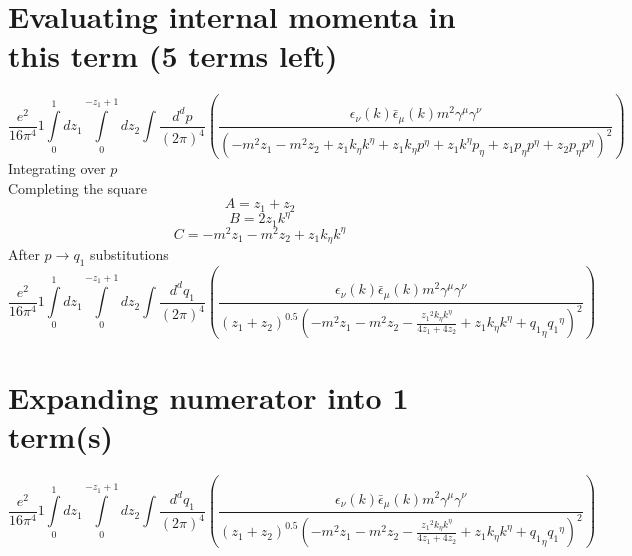 \section*{Evaluating internal momenta in this term (5 terms left)}
\begin{dmath}\frac{e^{2}}{16 \pi^{4}}1\int\limits_{ 0 }^{ 1 } d{ z_{ 1 } }\int\limits_{ 0 }^{ - { z_{ 1 } } + 1 } d{ z_{ 2 } }\int\frac{d^d p }{ (2\pi)^4 }\left(\frac{\epsilon_{ \nu }({ k }) \bar{\epsilon}_{ \mu }({ k }) m^{2} { \gamma^{ \mu } } { \gamma^{ \nu } }}{\left(- m^{2} { z_{ 1 } } - m^{2} { z_{ 2 } } + { z_{ 1 } } { { k }_{ \eta } } { { k }^{ \eta } } + { z_{ 1 } } { { k }_{ \eta } } { { p }^{ \eta } } + { z_{ 1 } } { { k }^{ \eta } } { { p }_{ \eta } } + { z_{ 1 } } { { p }_{ \eta } } { { p }^{ \eta } } + { z_{ 2 } } { { p }_{ \eta } } { { p }^{ \eta } }\right)^{2}}\right)\end{dmath}
Integrating over $p$\\
Completing the square\
\begin{dmath}A = { z_{ 1 } } + { z_{ 2 } }\end{dmath}
\begin{dmath}B = 2 { z_{ 1 } } { { k }^{ \eta } }\end{dmath}
\begin{dmath}C = - m^{2} { z_{ 1 } } - m^{2} { z_{ 2 } } + { z_{ 1 } } { { k }_{ \eta } } { { k }^{ \eta } }\end{dmath}
After $p \to q_1$ substitutions
\begin{dmath}\frac{e^{2}}{16 \pi^{4}}1\int\limits_{ 0 }^{ 1 } d{ z_{ 1 } }\int\limits_{ 0 }^{ - { z_{ 1 } } + 1 } d{ z_{ 2 } }\int\frac{d^d q_1 }{ (2\pi)^4 }\left(\frac{\epsilon_{ \nu }({ k }) \bar{\epsilon}_{ \mu }({ k }) m^{2} { \gamma^{ \mu } } { \gamma^{ \nu } }}{\left({ z_{ 1 } } + { z_{ 2 } }\right)^{0.5} \left(- m^{2} { z_{ 1 } } - m^{2} { z_{ 2 } } - \frac{{ z_{ 1 } }^{2} { { k }_{ \eta } } { { k }^{ \eta } }}{4 { z_{ 1 } } + 4 { z_{ 2 } }} + { z_{ 1 } } { { k }_{ \eta } } { { k }^{ \eta } } + { { q_1 }_{ \eta } } { { q_1 }^{ \eta } }\right)^{2}}\right)\end{dmath}
\section*{Expanding numerator into 1 term(s)}
\begin{dmath}\frac{e^{2}}{16 \pi^{4}}1\int\limits_{ 0 }^{ 1 } d{ z_{ 1 } }\int\limits_{ 0 }^{ - { z_{ 1 } } + 1 } d{ z_{ 2 } }\int\frac{d^d q_1 }{ (2\pi)^4 }\left(\frac{\epsilon_{ \nu }({ k }) \bar{\epsilon}_{ \mu }({ k }) m^{2} { \gamma^{ \mu } } { \gamma^{ \nu } }}{\left({ z_{ 1 } } + { z_{ 2 } }\right)^{0.5} \left(- m^{2} { z_{ 1 } } - m^{2} { z_{ 2 } } - \frac{{ z_{ 1 } }^{2} { { k }_{ \eta } } { { k }^{ \eta } }}{4 { z_{ 1 } } + 4 { z_{ 2 } }} + { z_{ 1 } } { { k }_{ \eta } } { { k }^{ \eta } } + { { q_1 }_{ \eta } } { { q_1 }^{ \eta } }\right)^{2}}\right)\end{dmath}
